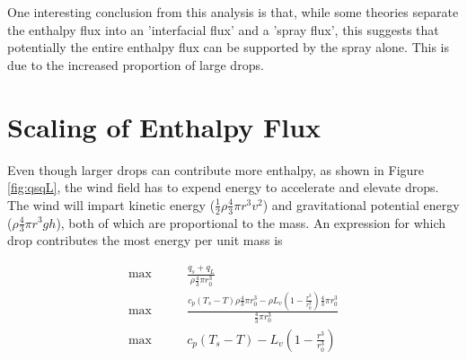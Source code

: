 \documentclass[10pt,a4paper]{article}
\begin{document}
One interesting conclusion from this analysis is that, while some theories separate the enthalpy flux into an 'interfacial flux' and a 'spray flux', this suggests that potentially the entire enthalpy flux can be supported by the spray alone. This is due to the increased proportion of large drops.

\section{Scaling of Enthalpy Flux} 

Even though larger drops can contribute more enthalpy, as shown in Figure \ref{fig:qsqL}, the wind field has to expend energy to accelerate and elevate drops. The wind will impart kinetic energy ($\frac{1}{2}\rho \frac{4}{3}\pi r^3 v^2$) and gravitational potential energy ($\rho \frac{4}{3}\pi r^3 gh$), both of which are proportional to the mass. An expression for which drop contributes the most energy per unit mass is

\begin{align}
\max& \qquad \frac{q_s + q_L}{\rho \frac{4}{3}\pi r_0^3}\\
\max& \qquad \frac{c_p \left(T_s - T\right)\rho \frac{4}{3}\pi r_0^3  -\rho L_v \left(1 - \frac{r^3}{r_0^3}\right)\frac{4}{3}\pi r_0^3}{\frac{4}{3}\pi r_0^3}\\
\max& \qquad c_p \left(T_s - T\right)  - L_v \left(1 - \frac{r^3}{r_0^3}\right)
\end{align}
\end{document}
